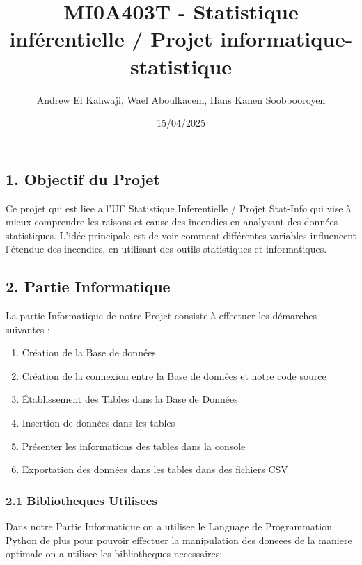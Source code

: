 \documentclass[
]{article}
\title{MI0A403T - Statistique inférentielle / Projet
informatique-statistique}
\author{Andrew El Kahwaji, Wael Aboulkacem, Hans Kanen Soobbooroyen}
\date{15/04/2025}
\providecommand{\tightlist}{%
  \setlength{\itemsep}{0pt}\setlength{\parskip}{0pt}}
\begin{document}
\maketitle

{
\setcounter{tocdepth}{3}
\tableofcontents
}
\subsection{1. Objectif du Projet}\label{objectif-du-projet}

Ce projet qui est liee a l'UE Statistique Inferentielle / Projet
Stat-Info qui vise à mieux comprendre les raisons et cause des incendies
en analysant des données statistiques. L'idée principale est de voir
comment différentes variables influencent l'étendue des incendies, en
utilisant des outils statistiques et informatiques.

\subsection{2. Partie Informatique}\label{partie-informatique}

La partie Informatique de notre Projet consiste à effectuer les
démarches suivantes :

\begin{enumerate}
\def\labelenumi{\arabic{enumi}.}
\tightlist
\item
  Création de la Base de données
\item
  Création de la connexion entre la Base de données et notre code source
\item
  Établissement des Tables dans la Base de Données
\item
  Insertion de données dans les tables
\item
  Présenter les informations des tables dans la console
\item
  Exportation des données dans les tables dans des fichiers CSV
\end{enumerate}

\subsubsection{2.1 Bibliotheques
Utilisees}\label{bibliotheques-utilisees}

Dans notre Partie Informatique on a utilisee le Language de
Programmation Python de plus pour pouvoir effectuer la manipulation des
doneees de la maniere optimale on a utilisee les bibliotheques
necessaires:
\end{document}
